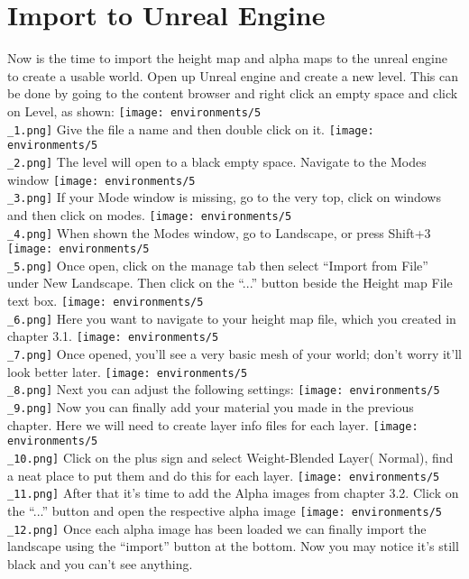 \documentclass[../main.tex]{subfiles}
\begin{document}
\section{Import to Unreal Engine}
Now is the time to import the height map and alpha maps to the unreal engine to create a usable world.
Open up Unreal engine and create a new level. This can be done by going to the content browser and right click an empty space and click on Level, as shown:
\texttt{[image: environments/5\\\_1.png]}
Give the file a name and then double click on it.
\texttt{[image: environments/5\\\_2.png]}
The level will open to a black empty space. Navigate to the Modes window
\texttt{[image: environments/5\\\_3.png]}
If your Mode window is missing, go to the very top, click on windows and then click on modes.
\texttt{[image: environments/5\\\_4.png]}
When shown the Modes window, go to Landscape, or press Shift+3
\texttt{[image: environments/5\\\_5.png]}
Once open, click on the manage tab then select “Import from File” under New Landscape. Then click on the “...” button beside the Height map File text box.
\texttt{[image: environments/5\\\_6.png]}
Here you want to navigate to your height map file, which you created in chapter 3.1.
\texttt{[image: environments/5\\\_7.png]}
Once opened, you’ll see a very basic mesh of your world; don’t worry it’ll look better later.
\texttt{[image: environments/5\\\_8.png]}
Next you can adjust the following settings:
\texttt{[image: environments/5\\\_9.png]}
Now you can finally add your material you made in the previous chapter. Here we will need to create layer info files for each layer.
\texttt{[image: environments/5\\\_10.png]}
Click on the plus sign and select Weight-Blended Layer( Normal), find a neat place to put them and do this for each layer.
\texttt{[image: environments/5\\\_11.png]}
After that it’s time to add the Alpha images from chapter 3.2. Click on the “...” button and open the respective alpha image
\texttt{[image: environments/5\\\_12.png]}
Once each alpha image has been loaded we can finally import the landscape using the “import” button at the bottom.
Now you may notice it’s still black and you can’t see anything.
\end{document}
